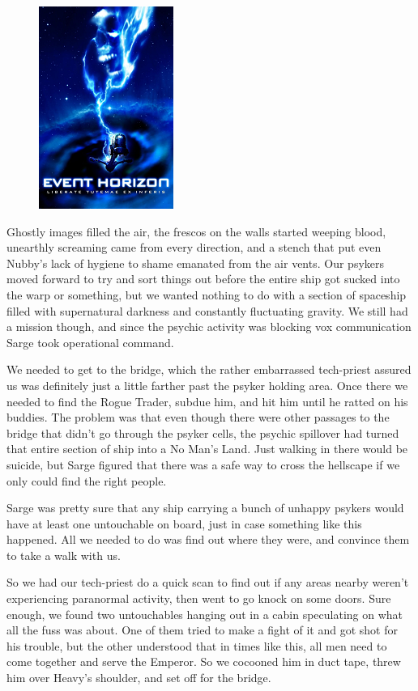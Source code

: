 \begin{figure}
\begin{center}
	\includegraphics[width=\figwidth]{pics/3/20.png}
\end{center}
\end{figure}
Ghostly images filled the air, the frescos on the walls started weeping blood, unearthly screaming came from every direction, and a stench that put even Nubby’s lack of hygiene to shame emanated from the air vents. 
Our psykers moved forward to try and sort things out before the entire ship got sucked into the warp or something, but we wanted nothing to do with a section of spaceship filled with supernatural darkness and constantly fluctuating gravity. 
We still had a mission though, and since the psychic activity was blocking vox communication Sarge took operational command.

We needed to get to the bridge, which the rather embarrassed tech-priest assured us was definitely just a little farther past the psyker holding area. 
Once there we needed to find the Rogue Trader, subdue him, and hit him until he ratted on his buddies. 
The problem was that even though there were other passages to the bridge that didn’t go through the psyker cells, the psychic spillover had turned that entire section of ship into a No Man’s Land. 
Just walking in there would be suicide, but Sarge figured that there was a safe way to cross the hellscape if we only could find the right people. 

Sarge was pretty sure that any ship carrying a bunch of unhappy psykers would have at least one untouchable on board, just in case something like this happened.
All we needed to do was find out where they were, and convince them to take a walk with us.

So we had our tech-priest do a quick scan to find out if any areas nearby weren’t experiencing paranormal activity, then went to go knock on some doors. 
Sure enough, we found two untouchables hanging out in a cabin speculating on what all the fuss was about. 
One of them tried to make a fight of it and got shot for his trouble, but the other understood that in times like this, all men need to come together and serve the Emperor. 
So we cocooned him in duct tape, threw him over Heavy’s shoulder, and set off for the bridge.

